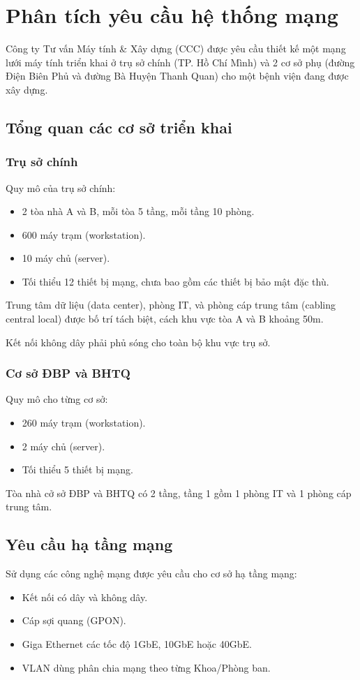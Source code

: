 \section{Phân tích yêu cầu hệ thống mạng}
Công ty Tư vấn Máy tính \& Xây dựng (CCC) được yêu cầu thiết kế một mạng lưới máy tính triển khai ở trụ sở chính (TP. Hồ Chí Mình) và 2 cơ sở phụ (đường Điện Biên Phủ và đường Bà Huyện Thanh Quan) cho một bệnh viện đang được xây dựng.

\subsection{Tổng quan các cơ sở triển khai}
\subsubsection{Trụ sở chính}
Quy mô của trụ sở chính:
\begin{itemize}
    \item 2 tòa nhà A và B, mỗi tòa 5 tầng, mỗi tầng 10 phòng.
    \item 600 máy trạm (workstation).
    \item 10 máy chủ (server).
    \item Tối thiểu 12 thiết bị mạng, chưa bao gồm các thiết bị bảo mật đặc thù.
\end{itemize}

Trung tâm dữ liệu (data center), phòng IT, và phòng cáp trung tâm (cabling central local) được bố trí tách biệt, cách khu vực tòa A và B khoảng 50m.

Kết nối không dây phải phủ sóng cho toàn bộ khu vực trụ sở.

\subsubsection{Cơ sở ĐBP và BHTQ}
Quy mô cho từng cơ sở:
\begin{itemize}
    \item 260 máy trạm (workstation).
    \item 2 máy chủ (server).
    \item Tối thiểu 5 thiết bị mạng.
\end{itemize}

Tòa nhà cở sở ĐBP và BHTQ có 2 tầng, tầng 1 gồm 1 phòng IT và 1 phòng cáp trung tâm.

\subsection{Yêu cầu hạ tầng mạng}
Sử dụng các công nghệ mạng được yêu cầu cho cơ sở hạ tầng mạng:
\begin{itemize}
    \item Kết nối có dây và không dây.
    \item Cáp sợi quang (GPON).
    \item Giga Ethernet các tốc độ 1GbE, 10GbE hoặc 40GbE.
    \item VLAN dùng phân chia mạng theo từng Khoa/Phòng ban.
\end{itemize}


